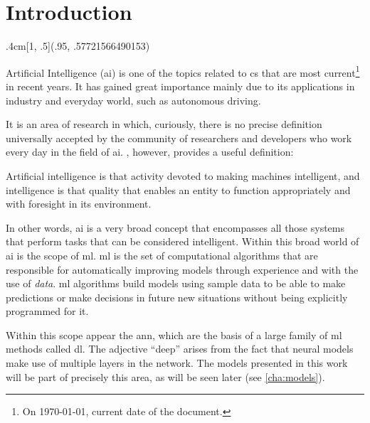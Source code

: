 

\chapter{Introduction}\label{cha:intro}

\begin{textblock*}{.4cm}[1, .5](.95\paperwidth, .57721566490153\paperheight)
  \noindent\resizebox{.4cm}{!}{\(\gamma\)}
\end{textblock*}



\drop Artificial Intelligence (\acs{ai}) is one
of the topics related to \gls{cs} that are most current\footnote{On \today,
  current date of the document.} in recent years. It has gained great
importance mainly due to its applications in industry and everyday world, such
as autonomous driving.

It is an area of research in which, curiously, there is no precise definition
universally accepted by the community of researchers and developers who work
every day in the field of \gls{ai}. ,
however, provides a useful definition:
\begin{quoteBox}
  Artificial intelligence is that activity devoted to making machines
  intelligent, and intelligence is that quality that enables an entity to
  function appropriately and with foresight in its environment.
  \tcblower{}
\end{quoteBox}

In other words, \gls{ai} is a very broad concept that encompasses all those
systems that perform tasks that can be considered intelligent. Within this
broad world of \gls{ai} is the scope of \gls{ml}. \Gls{ml} is the set of computational algorithms that are
responsible for automatically improving models through experience and with the
use of \emph{data}. \Gls{ml} algorithms build models using sample data to be
able to make predictions or make decisions in future new situations without
being explicitly programmed for it.

Within this scope appear the \gls{ann}, which are the basis of a large family
of \gls{ml} methods called \gls{dl}. The adjective
``deep'' arises from the fact that neural models make use of multiple layers in
the network. The models presented in this work will be part of precisely this
area, as will be seen later (see \vref{cha:models}).

